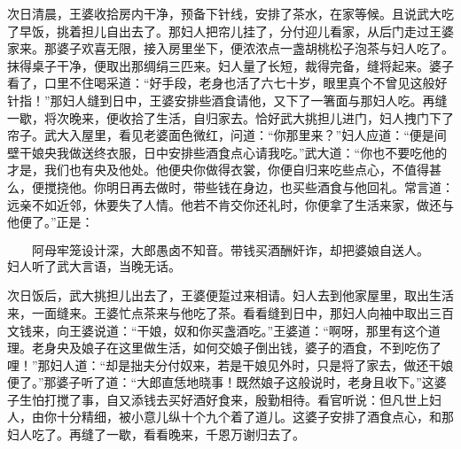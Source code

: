 次日清晨，王婆收拾房内干净，预备下针线，安排了茶水，在家等候。且说武大吃了早饭，挑着担儿自出去了。那妇人把帘儿挂了，分付迎儿看家，从后门走过王婆家来。那婆子欢喜无限，接入房里坐下，便浓浓点一盏胡桃松子泡茶与妇人吃了。抹得桌子干净，便取出那绸绢三匹来。妇人量了长短，裁得完备，缝将起来。婆子看了，口里不住喝采道：“好手段，老身也活了六七十岁，眼里真个不曾见这般好针指！”那妇人缝到日中，王婆安排些酒食请他，又下了一箸面与那妇人吃。再缝一歇，将次晚来，便收拾了生活，自归家去。恰好武大挑担儿进门，妇人拽门下了帘子。武大入屋里，看见老婆面色微红，问道：“你那里来？”妇人应道：“便是间壁干娘央我做送终衣服，日中安排些酒食点心请我吃。”武大道：“你也不要吃他的才是，我们也有央及他处。他便央你做得衣裳，你便自归来吃些点心，不值得甚么，便搅挠他。你明日再去做时，带些钱在身边，也买些酒食与他回礼。常言道：远亲不如近邻，休要失了人情。他若不肯交你还礼时，你便拿了生活来家，做还与他便了。”正是：

\[
阿母牢笼设计深，大郎愚卤不知音。
带钱买酒酬奸诈，却把婆娘自送人。
\]
妇人听了武大言语，当晚无话。

次日饭后，武大挑担儿出去了，王婆便踅过来相请。妇人去到他家屋里，取出生活来，一面缝来。王婆忙点茶来与他吃了茶。看看缝到日中，那妇人向袖中取出三百文钱来，向王婆说道：“干娘，奴和你买盏酒吃。”王婆道：“啊呀，那里有这个道理。老身央及娘子在这里做生活，如何交娘子倒出钱，婆子的酒食，不到吃伤了哩！”那妇人道：“却是拙夫分付奴来，若是干娘见外时，只是将了家去，做还干娘便了。”那婆子听了道：“大郎直恁地晓事！既然娘子这般说时，老身且收下。”这婆子生怕打搅了事，自又添钱去买好酒好食来，殷勤相待。看官听说：但凡世上妇人，由你十分精细，被小意儿纵十个九个着了道儿。这婆子安排了酒食点心，和那妇人吃了。再缝了一歇，看看晚来，千恩万谢归去了。

